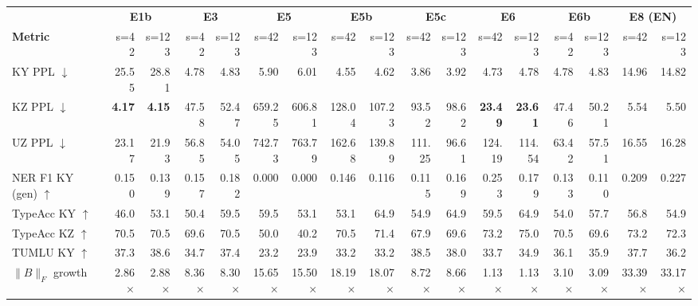 \documentclass[11pt]{article}
\begin{document}
\begin{table}[!htbp]
\centering
\tiny
\setlength{\tabcolsep}{1.2pt}
\begin{tabular}{lrrrrrrrrrrrrrrrr}
\toprule
 & \multicolumn{2}{c}{\textbf{E1b}} & \multicolumn{2}{c}{\textbf{E3}} & \multicolumn{2}{c}{\textbf{E5}} & \multicolumn{2}{c}{\textbf{E5b}} & \multicolumn{2}{c}{\textbf{E5c}} & \multicolumn{2}{c}{\textbf{E6}} & \multicolumn{2}{c}{\textbf{E6b}} & \multicolumn{2}{c}{\textbf{E8 (EN)}} \\
\cmidrule(lr){2-3}\cmidrule(lr){4-5}\cmidrule(lr){6-7}\cmidrule(lr){8-9}\cmidrule(lr){10-11}\cmidrule(lr){12-13}\cmidrule(lr){14-15}\cmidrule(lr){16-17}
\textbf{Metric} & s=42 & s=123 & s=42 & s=123 & s=42 & s=123 & s=42 & s=123 & s=42 & s=123 & s=42 & s=123 & s=42 & s=123 & s=42 & s=123 \\
\midrule
KY PPL $\downarrow$         & 25.55 & 28.81 & 4.78 & 4.83 & 5.90 & 6.01 & 4.55 & 4.62 & 3.86 & 3.92 & 4.73 & 4.78 & 4.78 & 4.83 & 14.96 & 14.82 \\
KZ PPL $\downarrow$         & \textbf{4.17} & \textbf{4.15} & 47.58 & 52.47 & 659.25 & 606.81 & 128.04 & 107.23 & 93.52 & 98.62 & \textbf{23.49} & \textbf{23.61} & 47.46 & 50.21 & 5.54 & 5.50 \\
UZ PPL $\downarrow$         & 23.17 & 21.93 & 56.85 & 54.05 & 742.73 & 763.79 & 162.68 & 139.89 & 111.25 & 96.61 & 124.19 & 114.54 & 63.42 & 57.51 & 16.55 & 16.28 \\
NER F1 KY (gen) $\uparrow$  & 0.150 & 0.139 & 0.157 & 0.182 & 0.000 & 0.000 & 0.146 & 0.116 & 0.115 & 0.169 & 0.253 & 0.179 & 0.133 & 0.110 & 0.209 & 0.227 \\
TypeAcc KY $\uparrow$       & 46.0 & 53.1 & 50.4 & 59.5 & 59.5 & 53.1 & 53.1 & 64.9 & 54.9 & 64.9 & 59.5 & 64.9 & 54.0 & 57.7 & 56.8 & 54.9 \\
TypeAcc KZ $\uparrow$       & 70.5 & 70.5 & 69.6 & 70.5 & 50.0 & 40.2 & 70.5 & 71.4 & 67.9 & 69.6 & 73.2 & 75.0 & 70.5 & 69.6 & 73.2 & 72.3 \\
TUMLU KY $\uparrow$         & 37.3 & 38.6 & 34.7 & 37.4 & 23.2 & 23.9 & 33.2 & 33.2 & 38.5 & 38.0 & 33.7 & 34.9 & 36.1 & 35.9 & 37.7 & 36.2 \\
$\|B\|_F$ growth            & 2.86$\times$ & 2.88$\times$ & 8.36$\times$ & 8.30$\times$ & 15.65$\times$ & 15.50$\times$ & 18.19$\times$ & 18.07$\times$ & 8.72$\times$ & 8.66$\times$ & 1.13$\times$ & 1.13$\times$ & 3.10$\times$ & 3.09$\times$ & 33.39$\times$ & 33.17$\times$ \\
\bottomrule
\end{tabular}

\end{table}
\end{document}
